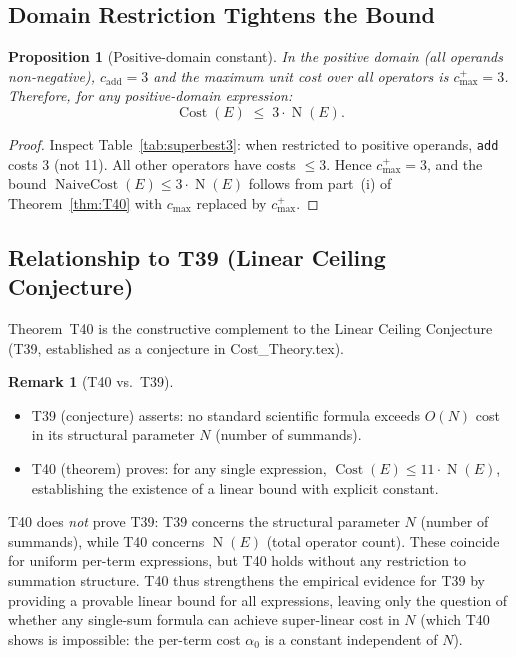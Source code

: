 \documentclass[12pt,a4paper]{article}
\newtheorem{proposition}[theorem]{Proposition}
\theoremstyle{definition}
\newtheorem{remark}[theorem]{Remark}
\newcommand{\Cost}{\operatorname{Cost}}
\newcommand{\NC}{\operatorname{NaiveCost}}
\newcommand{\NOp}{\operatorname{N}}
\begin{document}
\subsection{Domain Restriction Tightens the Bound}

\begin{proposition}[Positive-domain constant]
\label{prop:posdom}
In the positive domain (all operands non-negative), $c_{\mathrm{add}} = 3$ and
the maximum unit cost over all operators is $c_{\max}^{+} = 3$.
Therefore, for any positive-domain expression:
\[
  \Cost(E) \;\leq\; 3 \cdot \NOp(E).
\]
\end{proposition}

\begin{proof}
Inspect Table~\ref{tab:superbest3}: when restricted to positive operands,
\texttt{add} costs 3 (not 11).  All other operators have costs $\leq 3$.
Hence $c_{\max}^{+} = 3$, and the bound $\NC(E) \leq 3 \cdot \NOp(E)$ follows
from part~(i) of Theorem~\ref{thm:T40} with $c_{\max}$ replaced by $c_{\max}^{+}$.
\end{proof}

\subsection{Relationship to T39 (Linear Ceiling Conjecture)}

Theorem~T40 is the constructive complement to the Linear Ceiling Conjecture
(T39, established as a conjecture in Cost\_Theory.tex).

\begin{remark}[T40 vs.\ T39]
\begin{itemize}
  \item T39 (conjecture) asserts: no standard scientific formula exceeds
        $O(N)$ cost in its structural parameter $N$ (number of summands).
  \item T40 (theorem) proves: for any single expression, $\Cost(E) \leq 11 \cdot \NOp(E)$,
        establishing the existence of a linear bound with explicit constant.
\end{itemize}
T40 does \emph{not} prove T39: T39 concerns the structural parameter $N$
(number of summands), while T40 concerns $\NOp(E)$ (total operator count).
These coincide for uniform per-term expressions, but T40 holds without any
restriction to summation structure.  T40 thus strengthens the empirical
evidence for T39 by providing a provable linear bound for all expressions,
leaving only the question of whether any single-sum formula can achieve
super-linear cost in $N$ (which T40 shows is impossible: the per-term cost
$\alpha_0$ is a constant independent of $N$).
\end{remark}
\end{document}
